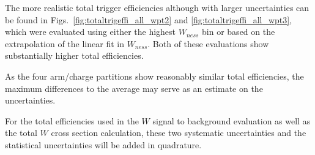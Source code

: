 The more realistic total trigger efficiencies although with larger uncertainties
can be found in Figs.~\ref{fig:totaltrigeffi_all_wpt2} and
\ref{fig:totaltrigeffi_all_wpt3}, which were evaluated using either the highest
$W_{ness}$ bin or based on the extrapolation of the linear fit in $W_{ness}$.
Both of these evaluations show substantially higher total efficiencies. 

As the four arm/charge partitions show reasonably similar total efficiencies, the
maximum differences to the average may serve as an estimate on the
uncertainties. 

For the total efficiencies used in the $W$ signal to background evaluation as
well as the total $W$ cross section calculation, these two systematic
uncertainties and the statistical uncertainties will be added in quadrature. 
